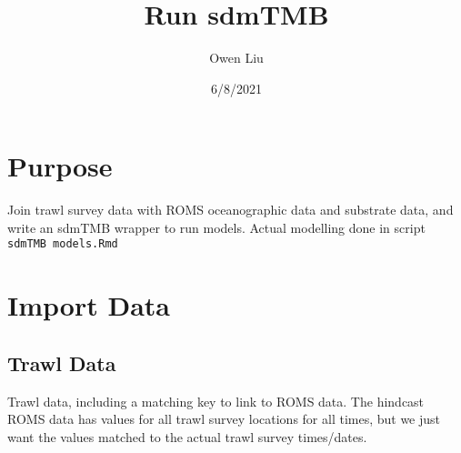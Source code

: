 \documentclass[
]{article}
\title{Run sdmTMB}
\author{Owen Liu}
\date{6/8/2021}
\begin{document}
\maketitle

{
\setcounter{tocdepth}{2}
\tableofcontents
}
\hypertarget{purpose}{%
\section{Purpose}\label{purpose}}

Join trawl survey data with ROMS oceanographic data and substrate data,
and write an sdmTMB wrapper to run models. Actual modelling done in
script \texttt{sdmTMB\ models.Rmd}

\hypertarget{import-data}{%
\section{Import Data}\label{import-data}}

\hypertarget{trawl-data}{%
\subsection{Trawl Data}\label{trawl-data}}

Trawl data, including a matching key to link to ROMS data. The hindcast
ROMS data has values for all trawl survey locations for all times, but
we just want the values matched to the actual trawl survey times/dates.
\end{document}
